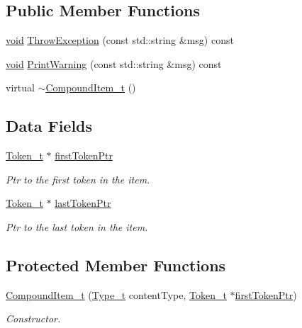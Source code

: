 \subsection*{Public Member Functions}
\begin{DoxyCompactItemize}
\item 
\hyperlink{_t_e_m_p_l_a_t_e__cdef_8h_ac9c84fa68bbad002983e35ce3663c686}{void} \hyperlink{struct_compound_item__t_a639ca50a028cd94d8f3270007fcf2387}{Throw\+Exception} (const std\+::string \&msg) const 
\item 
\hyperlink{_t_e_m_p_l_a_t_e__cdef_8h_ac9c84fa68bbad002983e35ce3663c686}{void} \hyperlink{struct_compound_item__t_a2861bc75390d042bc8d4c8224c5ffbfd}{Print\+Warning} (const std\+::string \&msg) const 
\item 
virtual \hyperlink{struct_compound_item__t_ac908d7c836c4d9774f17026deade14ec}{$\sim$\+Compound\+Item\+\_\+t} ()
\end{DoxyCompactItemize}
\subsection*{Data Fields}
\begin{DoxyCompactItemize}
\item 
\hyperlink{struct_token__t}{Token\+\_\+t} $\ast$ \hyperlink{struct_compound_item__t_a4d95dc788120f627e332491589d20c5c}{first\+Token\+Ptr}
\begin{DoxyCompactList}\small\item\em Ptr to the first token in the item. \end{DoxyCompactList}\item 
\hyperlink{struct_token__t}{Token\+\_\+t} $\ast$ \hyperlink{struct_compound_item__t_ac4a3acd5ad3db3a3ed48a672999e9326}{last\+Token\+Ptr}
\begin{DoxyCompactList}\small\item\em Ptr to the last token in the item. \end{DoxyCompactList}\end{DoxyCompactItemize}
\subsection*{Protected Member Functions}
\begin{DoxyCompactItemize}
\item 
\hyperlink{struct_compound_item__t_a7ce3b02a11f1ae28a5a5739ca954ce76}{Compound\+Item\+\_\+t} (\hyperlink{struct_content__t_a9ba94026278eb679d8d42d28725b0eae}{Type\+\_\+t} content\+Type, \hyperlink{struct_token__t}{Token\+\_\+t} $\ast$\hyperlink{struct_compound_item__t_a4d95dc788120f627e332491589d20c5c}{first\+Token\+Ptr})
\begin{DoxyCompactList}\small\item\em Constructor. \end{DoxyCompactList}\end{DoxyCompactItemize}
